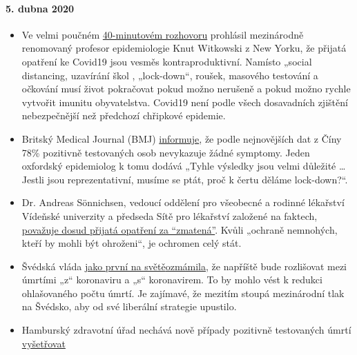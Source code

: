 \hypertarget{5-dubna-2020}{%
\paragraph{5. dubna 2020}\label{5-dubna-2020}}

\begin{itemize}
\tightlist
\item
  Ve velmi poučném
  \href{https://www.youtube.com/watch?v=lGC5sGdz4kg}{40-minutovém
  rozhovoru} prohlásil mezinárodně renomovaný profesor epidemiologie
  Knut Witkowski z New Yorku, že přijatá opatření ke Covid19 jsou vesměs
  kontraproduktivní. Namísto „social distancing, uzavírání škol ,
  „lock-down``, roušek, masového testování a očkování musí život
  pokračovat pokud možno nerušeně a pokud možno rychle vytvořit imunitu
  obyvatelstva. Covid19 není podle všech dosavadních zjištění
  nebezpečnější než předchozí chřipkové epidemie.
\item
  Britský Medical Journal (BMJ)
  \href{https://www.bmj.com/content/369/bmj.m1375}{informuje}, že podle
  nejnovějších dat z Číny 78\% pozitivně testovaných osob nevykazuje
  žádné symptomy. Jeden oxfordský epidemiolog k tomu dodává „Tyhle
  výsledky jsou velmi důležité \ldots{} Jestli jsou reprezentativní,
  musíme se ptát, proč k čertu děláme lock-down?``.
\item
  Dr. Andreas Sönnichsen, vedoucí oddělení pro všeobecné a rodinné
  lékařství Vídeňské univerzity a předseda Sítě pro lékařství založené
  na faktech,
  \href{https://www.diepresse.com/5794224/was-machen-wir-da-auf-den-intensivstationen-eigentlich}{považuje
  dosud přijatá opatření za ``zmatená''}. Kvůli „ochraně nemnohých,
  kteří by mohli být ohroženi``, je ochromen celý stát.
\item
  Švédská vláda
  \href{https://www.telegraph.co.uk/news/2020/04/03/coronavirus-swedish-experiment-could-prove-britain-wrong/\%20/t\%20_blank}{jako
  první na
  světě}\href{https://www.telegraph.co.uk/news/2020/04/03/coronavirus-swedish-experiment-could-prove-britain-wrong/\%20/t\%20_blank}{ozmámila},
  že napříště bude rozlišovat mezi úmrtími „z`` koronaviru a „s``
  koronavirem. To by mohlo vést k redukci ohlašovaného počtu úmrtí. Je
  zajímavé, že mezitím stoupá mezinárodní tlak na Švédsko, aby od své
  liberální strategie upustilo.
\item
  Hamburský zdravotní úřad nechává nově případy pozitivně testovaných
  úmrtí
  \href{https://www.t-online.de/nachrichten/deutschland/id_87636856/coronavirus-hamburg-will-nur-echte-covid-19-tote-zaehlen.html\%20/t\%20_blank}{vyšetřovat
}
\end{itemize}

